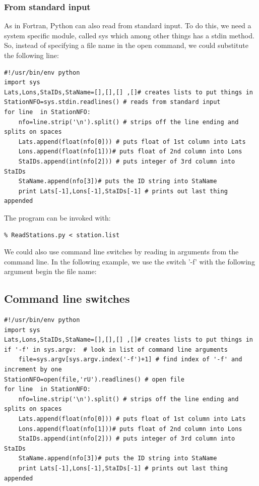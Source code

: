 \documentclass[11pt]{book}
\begin{document}
{ \subsubsection{From standard input}

As in Fortran, Python can also read from standard input.  To do this, we need a system specific module, called {\color{blue}sys} which among other things has a {\color{blue}stdin} method.  So, instead of specifying a file name in the {\color{blue}open} command, we could substitute the following line:


{ \color{blue} \begin{verbatim}
#!/usr/bin/env python
import sys
Lats,Lons,StaIDs,StaName=[],[],[] ,[]# creates lists to put things in
StationNFO=sys.stdin.readlines() # reads from standard input
for line  in StationNFO:
    nfo=line.strip('\n').split() # strips off the line ending and splits on spaces
    Lats.append(float(nfo[0])) # puts float of 1st column into Lats
    Lons.append(float(nfo[1]))# puts float of 2nd column into Lons
    StaIDs.append(int(nfo[2])) # puts integer of 3rd column into StaIDs
    StaName.append(nfo[3])# puts the ID string into StaName
    print Lats[-1],Lons[-1],StaIDs[-1] # prints out last thing appended
\end{verbatim}}

\noindent The program can be invoked with:

{\color{blue}\begin{verbatim}
% ReadStations.py < station.list
\end{verbatim}}

We could also use command line switches by reading in arguments from the command line.  In the following example, we use the switch '-f' with the following argument begin the file name: 
 
\subsection{Command line switches}

{ \color{blue} \begin{verbatim}
#!/usr/bin/env python
import sys
Lats,Lons,StaIDs,StaName=[],[],[] ,[]# creates lists to put things in
if '-f' in sys.argv:  # look in list of command line arguments
    file=sys.argv[sys.argv.index('-f')+1] # find index of '-f' and increment by one
StationNFO=open(file,'rU').readlines() # open file
for line  in StationNFO:
    nfo=line.strip('\n').split() # strips off the line ending and splits on spaces
    Lats.append(float(nfo[0])) # puts float of 1st column into Lats
    Lons.append(float(nfo[1]))# puts float of 2nd column into Lons
    StaIDs.append(int(nfo[2])) # puts integer of 3rd column into StaIDs
    StaName.append(nfo[3])# puts the ID string into StaName
    print Lats[-1],Lons[-1],StaIDs[-1] # prints out last thing appended
\end{verbatim}}

}
\end{document}
